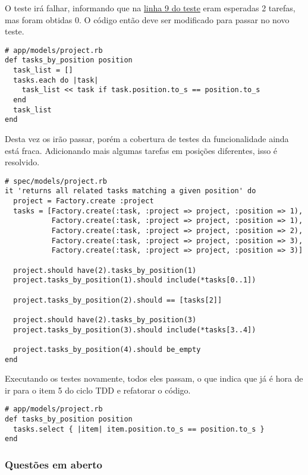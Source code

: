 O teste irá falhar, informando que na \hyperref[code:tdd_spec1]{linha 9 do teste} eram esperadas 2 tarefas, mas foram obtidas 0. O código então deve ser modificado para passar no novo teste.

\begin{lstlisting}[caption=Código do método Project\#tasks\_by\_position (versão 2),label=code:tdd_code2]
# app/models/project.rb
def tasks_by_position position
  task_list = []
  tasks.each do |task|
    task_list << task if task.position.to_s == position.to_s
  end
  task_list
end
\end{lstlisting}

Desta vez os irão passar, porém a cobertura de testes da funcionalidade ainda está fraca. Adicionando mais algumas tarefas em posições diferentes, isso é resolvido.

\begin{lstlisting}[caption=Teste do método Project\#tasks\_by\_position (versão 3),label=code:tdd_spec3]
# spec/models/project.rb
it 'returns all related tasks matching a given position' do
  project = Factory.create :project
  tasks = [Factory.create(:task, :project => project, :position => 1),
           Factory.create(:task, :project => project, :position => 1),
           Factory.create(:task, :project => project, :position => 2),
           Factory.create(:task, :project => project, :position => 3),
           Factory.create(:task, :project => project, :position => 3)]

  project.should have(2).tasks_by_position(1)
  project.tasks_by_position(1).should include(*tasks[0..1])

  project.tasks_by_position(2).should == [tasks[2]]

  project.should have(2).tasks_by_position(3)
  project.tasks_by_position(3).should include(*tasks[3..4])

  project.tasks_by_position(4).should be_empty
end
\end{lstlisting}

Executando os testes novamente, todos eles passam, o que indica que já é hora de ir para o item 5 do ciclo TDD e refatorar o código.

\begin{lstlisting}[caption=Código do método Project\#tasks\_by\_position (versão 3),label=code:tdd_code3]
# app/models/project.rb
def tasks_by_position position
  tasks.select { |item| item.position.to_s == position.to_s }
end
\end{lstlisting}

\subsubsection{Questões em aberto}
\label{ssub:tdd_em_averto}

